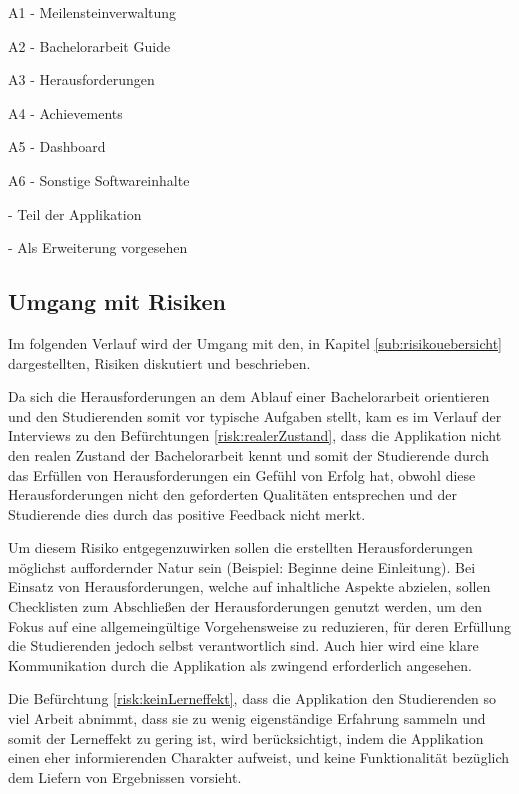 \documentclass[bibliography=totoc,listof=totoc,BCOR=5mm,DIV=12,oneside]{scrbook}
\begin{document}
\begin{tablenotes}
\item  A1 - Meilensteinverwaltung
\item  A2 - Bachelorarbeit Guide
\item  A3 - Herausforderungen
\item  A4 - Achievements
\item  A5 - Dashboard 
\item  A6 - Sonstige Softwareinhalte
\item {} - Teil der Applikation
\item {} - Als Erweiterung vorgesehen
\end{tablenotes} 
\label{tab:abdeckungProduktfunktionen}

\newpage
\subsection{Umgang mit Risiken}
\par Im folgenden Verlauf wird der Umgang mit den, in Kapitel \ref{sub:risikouebersicht} dargestellten, Risiken diskutiert und beschrieben.
\par \medskip Da sich die Herausforderungen an dem Ablauf einer Bachelorarbeit orientieren und den Studierenden somit vor typische Aufgaben stellt, kam es im Verlauf der Interviews zu den Befürchtungen \ref{risk:realerZustand}, dass die Applikation nicht den realen Zustand der Bachelorarbeit kennt und somit der Studierende durch das Erfüllen von Herausforderungen ein Gefühl von Erfolg hat, obwohl diese Herausforderungen nicht den geforderten Qualitäten entsprechen und der Studierende dies durch das positive Feedback nicht merkt.
\par Um diesem Risiko entgegenzuwirken sollen die erstellten Herausforderungen möglichst auffordernder Natur sein (Beispiel: Beginne deine Einleitung). Bei Einsatz von Herausforderungen, welche auf inhaltliche Aspekte abzielen, sollen Checklisten zum Abschließen der Herausforderungen genutzt werden, um den Fokus auf eine allgemeingültige Vorgehensweise zu reduzieren, für deren Erfüllung die Studierenden jedoch selbst verantwortlich sind. Auch hier wird eine klare Kommunikation durch die Applikation als zwingend erforderlich angesehen.

\par \medskip Die Befürchtung \ref{risk:keinLerneffekt}, dass die Applikation den Studierenden so viel Arbeit abnimmt, dass sie zu wenig eigenständige Erfahrung sammeln und somit der Lerneffekt zu gering ist, wird berücksichtigt, indem die Applikation einen eher informierenden Charakter aufweist, und keine Funktionalität bezüglich dem Liefern von Ergebnissen vorsieht.
\end{document}
